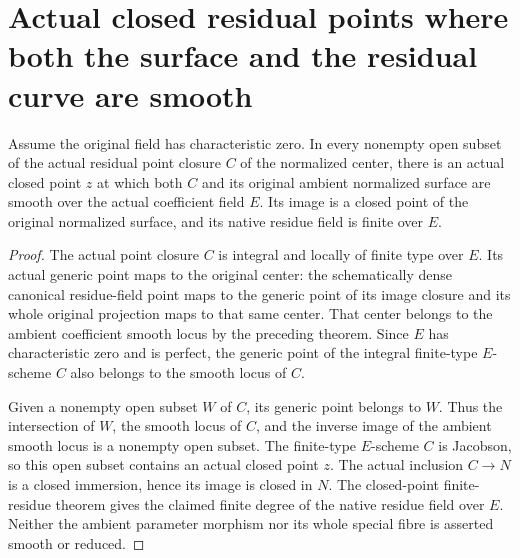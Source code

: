 \section{Actual closed residual points where both the surface and the residual curve are smooth}
\begin{theorem}\label{thm:normalized-residual-common-smooth-closed-points}
Assume the original field has characteristic zero. In every nonempty open subset of the actual residual point closure $C$ of the normalized center, there is an actual closed point $z$ at which both $C$ and its original ambient normalized surface are smooth over the actual coefficient field $E$. Its image is a closed point of the original normalized surface, and its native residue field is finite over $E$.
\leanok
\end{theorem}
\begin{proof}
The actual point closure $C$ is integral and locally of finite type over $E$. Its actual generic point maps to the original center: the schematically dense canonical residue-field point maps to the generic point of its image closure and its whole original projection maps to that same center. That center belongs to the ambient coefficient smooth locus by the preceding theorem. Since $E$ has characteristic zero and is perfect, the generic point of the integral finite-type $E$-scheme $C$ also belongs to the smooth locus of $C$.

Given a nonempty open subset $W$ of $C$, its generic point belongs to $W$. Thus the intersection of $W$, the smooth locus of $C$, and the inverse image of the ambient smooth locus is a nonempty open subset. The finite-type $E$-scheme $C$ is Jacobson, so this open subset contains an actual closed point $z$. The actual inclusion $C\to N$ is a closed immersion, hence its image is closed in $N$. The closed-point finite-residue theorem gives the claimed finite degree of the native residue field over $E$. Neither the ambient parameter morphism nor its whole special fibre is asserted smooth or reduced.
\end{proof}
